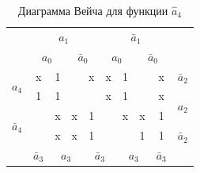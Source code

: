 \documentclass[a4paper,14pt]{article}
\begin{document}
\begin{table}[H]
			\begin{center}
		\caption{\label{tab:a4_preobr} Диаграмма Вейча для функции $\hat{a}_4$}
	\begin{tabular}{cccccccccc}
		                                                  &                                     \multicolumn{4}{c}{$a_1$}                                     &                                  \multicolumn{4}{c}{$\bar{a}_1$}                                  &                        \\
		                                                  &            \multicolumn{2}{c}{$a_0$}            &         \multicolumn{2}{c}{$\bar{a}_0$}         &            \multicolumn{2}{c}{$a_0$}            &         \multicolumn{2}{c}{$\bar{a}_0$}         &                        \\ \cline{2-9}
		   \multicolumn{1}{c|}{\multirow{2}{*}{$a_4$}}    & \multicolumn{1}{c|}{x} & \multicolumn{1}{c|}{1} & \multicolumn{1}{c|}{}  & \multicolumn{1}{c|}{x} & \multicolumn{1}{c|}{x} & \multicolumn{1}{c|}{1} & \multicolumn{1}{c|}{}  & \multicolumn{1}{c|}{x} &      $\bar{a}_2$       \\ \cline{2-9}
		              \multicolumn{1}{c|}{}               & \multicolumn{1}{c|}{1} & \multicolumn{1}{c|}{1} & \multicolumn{1}{c|}{}  & \multicolumn{1}{c|}{}  & \multicolumn{1}{c|}{x} & \multicolumn{1}{c|}{1} & \multicolumn{1}{c|}{}  & \multicolumn{1}{c|}{x} & \multirow{2}{*}{$a_2$} \\ \cline{2-9}
		\multicolumn{1}{c|}{\multirow{2}{*}{$\bar{a}_4$}} & \multicolumn{1}{c|}{}  & \multicolumn{1}{c|}{x} & \multicolumn{1}{c|}{x} & \multicolumn{1}{c|}{1} & \multicolumn{1}{c|}{}  & \multicolumn{1}{c|}{x} & \multicolumn{1}{c|}{x} & \multicolumn{1}{c|}{1} &                        \\ \cline{2-9}
		              \multicolumn{1}{c|}{}               & \multicolumn{1}{c|}{}  & \multicolumn{1}{c|}{x} & \multicolumn{1}{c|}{x} & \multicolumn{1}{c|}{1} & \multicolumn{1}{c|}{}  & \multicolumn{1}{c|}{}  & \multicolumn{1}{c|}{1} & \multicolumn{1}{c|}{1} &      $\bar{a}_2$       \\ \cline{2-9}
		                                                  &      $\bar{a}_3$       &            \multicolumn{2}{c}{$a_3$}            &         \multicolumn{2}{c}{$\bar{a}_3$}         &            \multicolumn{2}{c}{$a_3$}            &      $\bar{a}_3$       &
	\end{tabular}
\end{center}
\end{table}
\end{document}
